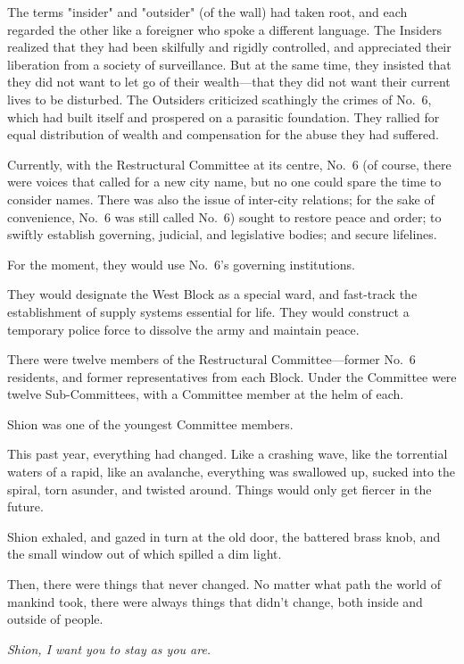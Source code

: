 The terms "insider" and "outsider" (of the wall) had taken root, and
each regarded the other like a foreigner who spoke a different language.
The Insiders realized that they had been skilfully and rigidly
controlled, and appreciated their liberation from a society of
surveillance. But at the same time, they insisted that they did not want
to let go of their wealth---that they did not want their current lives to
be disturbed. The Outsiders criticized scathingly the crimes of No.~6,
which had built itself and prospered on a parasitic foundation. They
rallied for equal distribution of wealth and compensation for the abuse
they had suffered.

Currently, with the Restructural Committee at its centre, No.~6 (of
course, there were voices that called for a new city name, but no one
could spare the time to consider names. There was also the issue of
inter-city relations; for the sake of convenience, No.~6 was still
called No.~6) sought to restore peace and order; to swiftly establish
governing, judicial, and legislative bodies; and secure lifelines.

For the moment, they would use No.~6's governing institutions.

They would designate the West Block as a special ward, and fast-track
the establishment of supply systems essential for life. They would
construct a temporary police force to dissolve the army and maintain
peace.

There were twelve members of the Restructural
Committee---former No.~6 residents, and former representatives from each
Block. Under the Committee were twelve Sub-Committees, with a Committee
member at the helm of each.

Shion was one of the youngest Committee members.

This past year, everything had changed. Like a crashing wave, like the
torrential waters of a rapid, like an avalanche, everything was
swallowed up, sucked into the spiral, torn asunder, and twisted around.
Things would only get fiercer in the future.

Shion exhaled, and gazed in turn at the old door, the battered brass
knob, and the small window out of which spilled a dim light.

Then, there were things that never changed. No matter what path the
world of mankind took, there were always things that didn't change, both
inside and outside of people.

\emph{Shion, I want you to stay as you are.}


